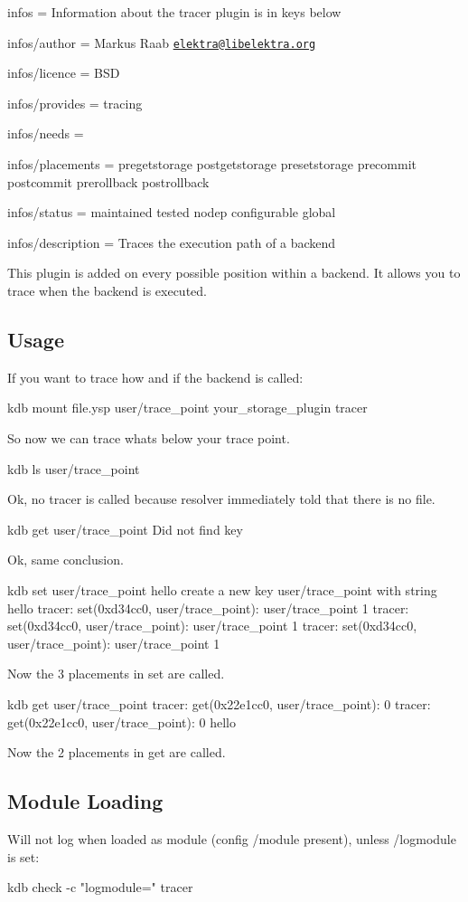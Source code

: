 
\begin{DoxyItemize}
\item infos = Information about the tracer plugin is in keys below
\item infos/author = Markus Raab \href{mailto:elektra@libelektra.org}{\tt elektra@libelektra.\+org}
\item infos/licence = B\+S\+D
\item infos/provides = tracing
\item infos/needs =
\item infos/placements = pregetstorage postgetstorage presetstorage precommit postcommit prerollback postrollback
\item infos/status = maintained tested nodep configurable global
\item infos/description = Traces the execution path of a backend
\end{DoxyItemize}

This plugin is added on every possible position within a backend. It allows you to trace when the backend is executed.

\subsection*{Usage}

If you want to trace how and if the backend is called\+: \begin{DoxyVerb}kdb mount file.ysp user/trace_point your_storage_plugin tracer
\end{DoxyVerb}


So now we can trace whats below your trace point. \begin{DoxyVerb}kdb ls user/trace_point
\end{DoxyVerb}


Ok, no tracer is called because resolver immediately told that there is no file. \begin{DoxyVerb}kdb get user/trace_point
Did not find key
\end{DoxyVerb}


Ok, same conclusion. \begin{DoxyVerb}kdb set user/trace_point hello
create a new key user/trace_point with string hello
tracer: set(0xd34cc0, user/trace_point): user/trace_point 1
tracer: set(0xd34cc0, user/trace_point): user/trace_point 1
tracer: set(0xd34cc0, user/trace_point): user/trace_point 1
\end{DoxyVerb}


Now the 3 placements in set are called. \begin{DoxyVerb}kdb get user/trace_point
tracer: get(0x22e1cc0, user/trace_point): 0
tracer: get(0x22e1cc0, user/trace_point): 0
hello
\end{DoxyVerb}


Now the 2 placements in get are called.

\subsection*{Module Loading}

Will not log when loaded as module (config {\ttfamily /module} present), unless {\ttfamily /logmodule} is set\+: \begin{DoxyVerb}kdb check -c "logmodule=" tracer\end{DoxyVerb}
 